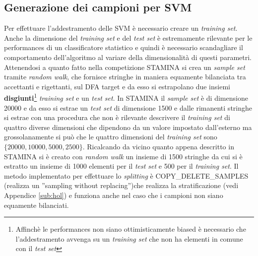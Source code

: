 \subsection{Generazione dei campioni per SVM}
\label{sub:csvm}
Per effettuare l'addestramento delle \ac{SVM} è necessario creare un \textit{training set}. Anche la dimensione del \textit{training set} e del \textit{test set} è estremamente rilevante per le performances di un classificatore statistico e quindi è necessario scandagliare il comportamento dell'algoritmo al variare della dimensionalità di questi parametri. Attenendosi a quanto fatto nella competizione STAMINA \cite{Stamina10} si crea un \textit{sample set} tramite \textit{random walk}, che fornisce stringhe in maniera equamente bilanciata tra accettanti e rigettanti, sul \ac{DFA} target e da esso si estrapolano due insiemi \textbf{disgiunti}\footnote{Affinchè le performances non siano ottimisticamente biased è necessario che l'addestramento avvenga su un \textit{training set} che non ha elementi in comune con il \textit{test set}} \textit{training set} e un \textit{test set}. In STAMINA il \textit{sample set} è di dimensione 20000 e da esso si estrae un \textit{test set} di dimensione 1500 e dalle rimanenti stringhe si estrae con una procedura che non è rilevante descrivere il \textit{training set} di quattro diverse dimensioni che dipendono da un valore impostato dall'esterno ma grossolanamente si può che le quattro dimensioni del \textit{training set} sono $\{20000,10000,5000,2500\}$. Ricalcando da vicino quanto appena descritto in STAMINA si è creato con \textit{random walk} un insieme di 1500 stringhe da cui si è estratto un insieme di 1000 elementi per il \textit{test set} e 500 per il \textit{training set}. Il metodo implementato per effettuare lo \textit{splitting} è COPY\_DELETE\_SAMPLES (realizza un ''sampling without replacing'')che realizza la stratificazione (vedi Appendice \ref{sub:hol}) e funziona anche nel caso che i campioni non siano equamente bilanciati.
